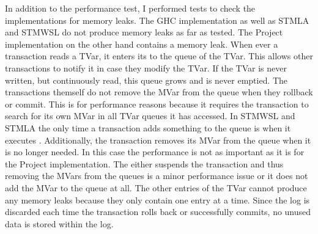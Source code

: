 In addition to the performance test, I performed tests to check the implementations for memory leaks. The GHC implementation
as well as STMLA and STMWSL do not produce memory leaks as far as tested. The Project implementation on the other hand 
contains a memory leak. When ever a transaction reads a TVar, it enters its  to the queue of the TVar.
This allows other transactions to notify it in case they modify the TVar. If the TVar is never written, but continuously read, this queue grows
and is never emptied. The transactions themself do not remove the MVar from the queue when they rollback or commit.
This is for performance reasons because it requires the transaction to search for its own MVar in all TVar queues it 
has accessed. In STMWSL and STMLA the only time a transaction adds something to the queue is when it executes 
. Additionally, the transaction removes its MVar from the queue when it is no longer needed. In this 
case the performance is not as important as it is for the Project implementation. The  either suspends 
the transaction and thus removing the MVars from the queues is a minor performance issue or it does not add the MVar to
the queue at all. The other entries of the TVar cannot produce any memory leaks because they only contain one entry
at a time. Since the log is discarded each time the transaction rolls back or successfully commits, no unused data is stored
within the log.